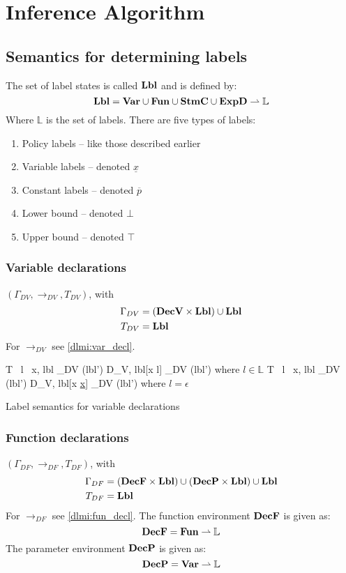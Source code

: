 
\section{Inference Algorithm}

\subsection{Semantics for determining labels}
The set of label states is called $\mathbf{Lbl}$ and is defined by:
\[
  \mathbf{Lbl} = \mathbf{Var} \cup \mathbf{Fun} \cup \mathbf{StmC} \cup \mathbf{ExpD} \rightharpoonup \mathbb{L}
\]
Where $\mathbb{L}$ is the set of labels.
There are five types of labels:
\begin{enumerate}
  \item Policy labels -- like those described earlier
  \item Variable labels -- denoted $\underline{x}$
  \item Constant labels -- denoted $\overline{p}$
  \item Lower bound -- denoted $\bot$
  \item Upper bound -- denoted $\top$
\end{enumerate}

\subsubsection{Variable declarations}
$(\Gamma_{DV}, \rightarrow_{DV}, T_{DV})$, with
\begin{align*}
  \Gamma_{DV} & = (\mathbf{DecV} \times \mathbf{Lbl}) \cup \mathbf{Lbl} \\
  T_{DV} & = \mathbf{Lbl} \\
\end{align*}
For $\rightarrow_{DV}$ see \cref{dlmi:var_decl}.

\begin{table}
        {\langle T \, l \, x, lbl \rangle \rightarrow_{DV} (lbl')}
        {\langle D_V, lbl[x \mapsto l] \rangle \rightarrow_{DV} (lbl')}
        {where $l \in \mathbb{L}$}
        {\langle T \, l \, x, lbl \rangle \rightarrow_{DV} (lbl')}
        {\langle D_V, lbl[x \mapsto \underline{x}] \rangle \rightarrow_{DV} (lbl')}
        {where $l = \epsilon$}
\caption{Label semantics for variable declarations}
\label{dlmi:var_decl}
\end{table}

\subsubsection{Function declarations}
$(\Gamma_{DF}, \rightarrow_{DF}, T_{DF})$, with
\begin{align*}
  \Gamma_{DF} & = (\mathbf{DecF} \times \mathbf{Lbl}) \cup (\mathbf{DecP} \times \mathbf{Lbl}) \cup \mathbf{Lbl} \\
  T_{DF} & = \mathbf{Lbl}
\end{align*}
For $\rightarrow_{DF}$ see \cref{dlmi:fun_decl}.
The function environment $\mathbf{DecF}$ is given as:
\[ \mathbf{DecF} = \mathbf{Fun} \rightharpoonup \mathbb{L} \]
The parameter environment $\mathbf{DecP}$ is given as:
\[ \mathbf{DecP} = \mathbf{Var} \rightharpoonup \mathbb{L} \]

